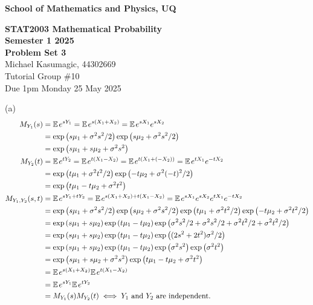 \documentclass[a4paper,12pt]{report}
\begin{document}
\begin{center}
{\bf School of Mathematics and Physics, UQ}
\end{center}
\begin{center}
	{\large\bf STAT2003 Mathematical Probability \\ Semester 1 2025 \\ Problem Set 3} \\ \vspace{1em}
	Michael Kasumagic, 44302669 \\
	Tutorial Group \#10 \\
	Due 1pm Monday 25 May 2025
\end{center}

\sol(a)
\begin{align*}
  M_{Y_1}(s) &= \mathbb{E}\hspace{0.13em} e^{sY_1} = \mathbb{E}\hspace{0.13em} e^{s(X_1 + X_2)} = \mathbb{E}\hspace{0.13em} e^{sX_1}e^{sX_2} \\
    &= \exp\left( s\mu_1+\sigma^2s^2/2 \right)\exp\left( s\mu_2+\sigma^2s^2/2 \right) \\
    &= \exp\left( s\mu_1 + s\mu_2 + \sigma^2s^2 \right) \\
  M_{Y_2}(t) &= \mathbb{E}\hspace{0.13em} e^{tY_2} = \mathbb{E}\hspace{0.13em} e^{t(X_1 - X_2)} = \mathbb{E}\hspace{0.13em} e^{t(X_1 + (-X_2))} = \mathbb{E}\hspace{0.13em} e^{tX_1}e^{-tX_2}  \\
    &= \exp\left( t\mu_1+\sigma^2t^2/2 \right)\exp\left( -t\mu_2+\sigma^2(-t)^2/2 \right) \\
    &= \exp\left( t\mu_1 - t\mu_2 + \sigma^2t^2 \right)\\
  M_{Y_1,Y_2}(s,t) &= \mathbb{E}\hspace{0.13em} e^{sY_1 + tY_2} = \mathbb{E}\hspace{0.13em} e^{s(X_1 + X_2) + t(X_1 - X_2)} = \mathbb{E}\hspace{0.13em} e^{sX_1} e^{sX_2} e^{tX_1} e^{-tX_2} \\
    &= \exp\left( s\mu_1+\sigma^2s^2/2 \right)\exp\left( s\mu_2+\sigma^2s^2/2 \right)\exp\left( t\mu_1+\sigma^2t^2/2 \right)\exp\left( -t\mu_2+\sigma^2t^2/2 \right) \\
    &= \exp\left( s\mu_1 + s\mu_2 \right)\exp\left( t\mu_1 - t\mu_2 \right)\exp\left( \sigma^2s^2/2 + \sigma^2s^2/2 + \sigma^2t^2/2 + \sigma^2t^2/2 \right) \\
    &= \exp\left( s\mu_1 + s\mu_2 \right)\exp\left( t\mu_1 - t\mu_2 \right)\exp\left( (2s^2 + 2t^2)\sigma^2/2 \right) \\
    &= \exp\left( s\mu_1 + s\mu_2 \right)\exp\left( t\mu_1 - t\mu_2 \right)\exp\left( \sigma^2s^2 \right)\exp\left( \sigma^2t^2 \right) \\
    &= \exp\left( s\mu_1 + s\mu_2 + \sigma^2s^2 \right)\exp\left( t\mu_1 - t\mu_2 + \sigma^2t^2 \right) \\
    &= \mathbb{E}\hspace{0.13em} e^{s(X_1 + X_2)} \mathbb{E}\hspace{0.13em} e^{t(X_1 - X_2)} \\
    &= \mathbb{E}\hspace{0.13em} e^{sY_1} \mathbb{E}\hspace{0.13em} e^{tY_2} \\
    &= M_{Y_1}(s) M_{Y_2}(t) \iff Y_1\ \text{and}\ Y_2\ \text{are independent.}
\end{align*}
\end{document}
